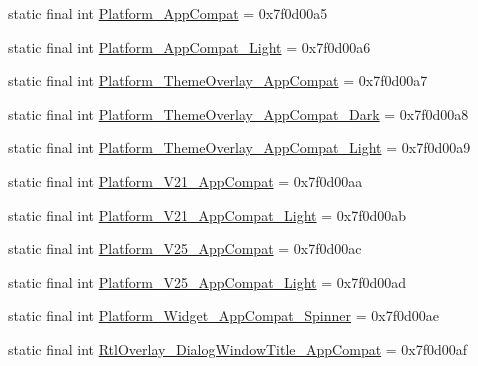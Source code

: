 \begin{DoxyCompactItemize}
\item 
static final int \mbox{\hyperlink{classcom_1_1synnapps_1_1carouselview_1_1_r_1_1style_abf7fa91e976c41f68ba673993b68d5a2}{Platform\+\_\+\+App\+Compat}} = 0x7f0d00a5
\item 
static final int \mbox{\hyperlink{classcom_1_1synnapps_1_1carouselview_1_1_r_1_1style_a695e89a9e8ebf1038fd88bb76c4718ac}{Platform\+\_\+\+App\+Compat\+\_\+\+Light}} = 0x7f0d00a6
\item 
static final int \mbox{\hyperlink{classcom_1_1synnapps_1_1carouselview_1_1_r_1_1style_a6283e9b42c0551ef1c3188d6d97f9fcf}{Platform\+\_\+\+Theme\+Overlay\+\_\+\+App\+Compat}} = 0x7f0d00a7
\item 
static final int \mbox{\hyperlink{classcom_1_1synnapps_1_1carouselview_1_1_r_1_1style_a0029faf95ea7b70500abbbe22a0a9441}{Platform\+\_\+\+Theme\+Overlay\+\_\+\+App\+Compat\+\_\+\+Dark}} = 0x7f0d00a8
\item 
static final int \mbox{\hyperlink{classcom_1_1synnapps_1_1carouselview_1_1_r_1_1style_abade513735e49c969ff7f851b2481d5b}{Platform\+\_\+\+Theme\+Overlay\+\_\+\+App\+Compat\+\_\+\+Light}} = 0x7f0d00a9
\item 
static final int \mbox{\hyperlink{classcom_1_1synnapps_1_1carouselview_1_1_r_1_1style_a4db7005c4aa08a4e9cdea893aa2b341e}{Platform\+\_\+\+V21\+\_\+\+App\+Compat}} = 0x7f0d00aa
\item 
static final int \mbox{\hyperlink{classcom_1_1synnapps_1_1carouselview_1_1_r_1_1style_a82bd690f85fc5b909b1770d5b04fd621}{Platform\+\_\+\+V21\+\_\+\+App\+Compat\+\_\+\+Light}} = 0x7f0d00ab
\item 
static final int \mbox{\hyperlink{classcom_1_1synnapps_1_1carouselview_1_1_r_1_1style_ab87b49dd6995a91967ca72686384f134}{Platform\+\_\+\+V25\+\_\+\+App\+Compat}} = 0x7f0d00ac
\item 
static final int \mbox{\hyperlink{classcom_1_1synnapps_1_1carouselview_1_1_r_1_1style_adc86c9f10021c3ff8e37d9cd570fa0e7}{Platform\+\_\+\+V25\+\_\+\+App\+Compat\+\_\+\+Light}} = 0x7f0d00ad
\item 
static final int \mbox{\hyperlink{classcom_1_1synnapps_1_1carouselview_1_1_r_1_1style_a5136e02b3b89e897891683bfc6ec6a8d}{Platform\+\_\+\+Widget\+\_\+\+App\+Compat\+\_\+\+Spinner}} = 0x7f0d00ae
\item 
static final int \mbox{\hyperlink{classcom_1_1synnapps_1_1carouselview_1_1_r_1_1style_a78e0ab529bb1fbaa125b713511780d01}{Rtl\+Overlay\+\_\+\+Dialog\+Window\+Title\+\_\+\+App\+Compat}} = 0x7f0d00af
\item 

\end{DoxyCompactItemize}
